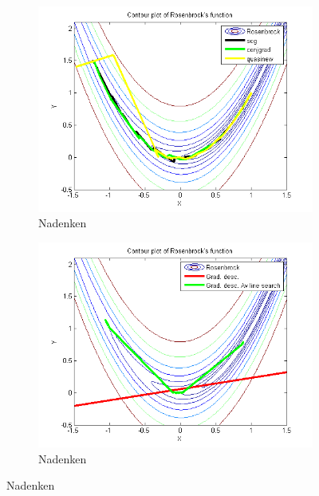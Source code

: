 \documentclass{article}
\begin{document}
\begin{figure}[H]
	\centering
	\begin{subfigure}[b]{0.45\textwidth}
		\includegraphics[width=\textwidth]{rosenbrocktask1.png}
		\caption{Nadenken}
		\label{fig:rosenbrocktask1}
	\end{subfigure}
	\begin{subfigure}[b]{0.45\textwidth}
		\includegraphics[width=\textwidth]{rosenbrocktask12.png}
		\caption{Nadenken}
		\label{fig:rosenbrocktask1}
	\end{subfigure}	
\end{figure}
\end{document}
